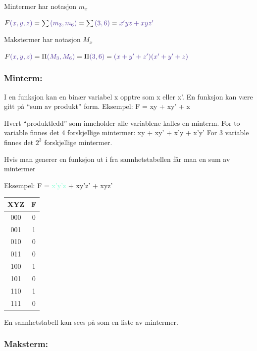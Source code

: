 \documentclass{article}
\begin{document}
	Mintermer har notasjon $m_x$
	
	$F\textcolor{Violet}{(x,y,z)} = \sum\textcolor{Violet}{(m_3, m_6)} = \sum\textcolor{Violet}{(3, 6)} = \textcolor{Violet}{ x'yz + xyz'} $
	
	Makstermer har notasjon $M_x$
	
	$F\textcolor{Violet}{(x,y,z)} = \Pi \textcolor{Violet}{(M_3, M_6)} = \Pi \textcolor{Violet}{(3, 6)} = \textcolor{Violet}{(x+y'+z')(x'+y'+z)} $
	
	\subsubsection{Minterm:}
	I en funksjon kan en binær variabel x opptre som x eller x'.	En funksjon kan være gitt på “sum av produkt” form.
	Eksempel: F = xy + xy' + x
	
	Hvert “produktledd” som inneholder alle variablene kalles en minterm. For to variable finnes det 4 forskjellige mintermer: xy + xy' + x'y + x'y'
	For 3 variable finnes det $2^3$ forskjellige mintermer. 
	
	Hvis man generer en funksjon ut i fra sannhetstabellen får man en sum av mintermer
	
	Eksempel:  F = \textcolor{Aquamarine}{x'y'z} + \textcolor{BurntOrange}{xy'z'} + \textcolor{WildStrawberry}{xyz'}
	
	
	\begin{center}
		\begin{tabular}{|c|c|}
			\hline
			XYZ & F \\ \hline
			000 & 0  \\ \hline
			001 & \color{Aquamarine}1  \\ \hline 
			010 & 0  \\ \hline
			011 & 0  \\ \hline 
			100 & \color{BurntOrange}1  \\ \hline
			101 & 0  \\ \hline
			110 & \color{WildStrawberry}1  \\ \hline
			111 & 0  \\ \hline
			
		\end{tabular}
	\end{center}
	
	En sannhetstabell kan sees på som en liste av mintermer.
	
	\subsubsection{Maksterm:}
	
\end{document}
